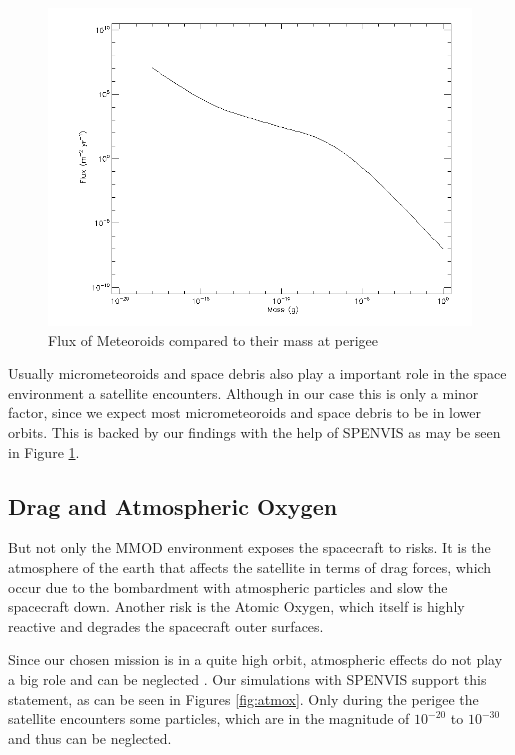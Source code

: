 \begin{figure}[H]
	\centering
	\includegraphics[width=\linewidth-15em]{spenvis/meteoroid_perigee}
		\caption{Flux of Meteoroids compared to their mass at perigee}
	\label{fig:perigee_mmod}
\end{figure}


Usually micrometeoroids and space debris also play a important role in the space environment a satellite encounters. Although in our case this is only a minor factor, since we expect most micrometeoroids and space debris to be in lower orbits. This is backed by our findings with the help of SPENVIS as may be seen in Figure \ref{fig:perigee_mmod}.



\subsection{Drag and Atmospheric Oxygen}
But not only the MMOD environment exposes the spacecraft to risks. It is the atmosphere of the earth that affects the satellite in terms of drag forces, which occur due to the bombardment with atmospheric particles and slow the spacecraft down. Another risk is the Atomic Oxygen, which itself is highly reactive and degrades the spacecraft outer surfaces.

Since our chosen mission is in a quite high orbit, atmospheric effects do not play a big role and can be neglected \citep{vallado2008}. Our simulations with SPENVIS support this statement, as can be seen in Figures \ref{fig:atmox}. Only during the perigee the satellite encounters some particles, which are in the magnitude of $10^{-20}$ to $10^{-30}$ and thus can be neglected.

